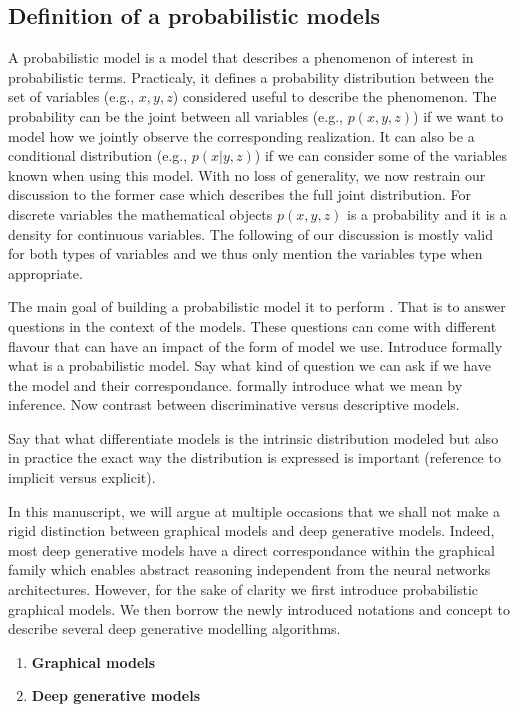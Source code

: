 \subsection{Definition of a probabilistic models}
A probabilistic model is a model that describes a phenomenon of interest in probabilistic terms. Practicaly, it defines a probability distribution between the set of variables (e.g., $x, y, z$) considered useful to describe the phenomenon. The probability can be the joint between all variables (e.g., $p(x, y, z)$) if we want to model how we jointly observe the corresponding realization. It can also be a conditional distribution  (e.g., $p(x | y, z)$) if we can consider some of the variables known when using this model. With no loss of generality, we now restrain our discussion to the former case which describes the full joint distribution. For discrete variables the mathematical objects $p(x, y, z)$ is a probability and it is a density for continuous variables. The following of our discussion is mostly valid for both types of variables and we thus only mention the variables type when appropriate.

The main goal of building a probabilistic model it to perform . That is to answer questions in the context of the models. These questions can come with different flavour that can have an impact of the form of model we use. 
Introduce formally what is a probabilistic model. Say what kind of question we can ask if we have the model and their correspondance. formally introduce what we mean by inference.
Now contrast between discriminative versus descriptive models.

Say that what differentiate models is the intrinsic distribution modeled but also in practice the exact way the distribution is expressed is important (reference to implicit versus explicit).

In this manuscript, we will argue at multiple occasions that we shall not make a rigid distinction between graphical models and deep generative models.
Indeed, most deep generative models have a direct correspondance within the graphical family which enables abstract reasoning independent from the neural networks architectures.
However, for the sake of clarity we first introduce probabilistic graphical models. We then borrow the newly introduced notations and concept to describe several deep generative modelling algorithms.
\begin{enumerate}
  \item \textbf{Graphical models}
  \item \textbf{Deep generative models}
\end{enumerate}


